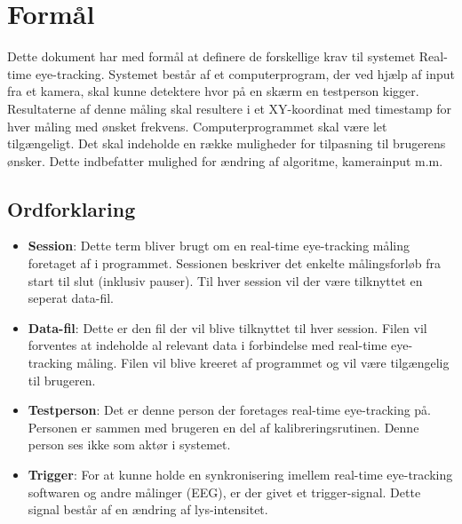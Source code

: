 \documentclass[analyse.tex]{subfiles}
\begin{document}
	
\section{Formål}
Dette dokument har med formål at definere de forskellige krav til systemet Real-time eye-tracking. 
Systemet består af et computerprogram, der ved hjælp af input fra et kamera, skal kunne detektere hvor på en skærm en testperson kigger. Resultaterne af denne måling skal resultere i et XY-koordinat med timestamp for hver måling med ønsket frekvens.
Computerprogrammet skal være let tilgængeligt. Det skal indeholde en række muligheder for tilpasning til brugerens ønsker. Dette indbefatter mulighed for ændring af algoritme, kamerainput m.m. 

\subsection{Ordforklaring}
\begin{itemize}
	\item \textbf{Session}: Dette term bliver brugt om en real-time eye-tracking måling foretaget af i programmet. Sessionen beskriver det enkelte målingsforløb fra start til slut (inklusiv pauser). Til hver session vil der være tilknyttet en seperat data-fil. 
	\item \textbf{Data-fil}: Dette er den fil der vil blive tilknyttet til hver session. Filen vil forventes at indeholde al relevant data i forbindelse med real-time eye-tracking måling. Filen vil blive kreeret af programmet og vil være tilgængelig til brugeren. 
	\item \textbf{Testperson}: Det er denne person der foretages real-time eye-tracking på. Personen er sammen med brugeren en del af kalibreringsrutinen. Denne person ses ikke som aktør i systemet. 
	\item \textbf{Trigger}: For at kunne holde en synkronisering imellem real-time eye-tracking softwaren og andre målinger (EEG), er der givet et trigger-signal. Dette signal består af en ændring af lys-intensitet. 
\end{itemize} 
\end{document}

